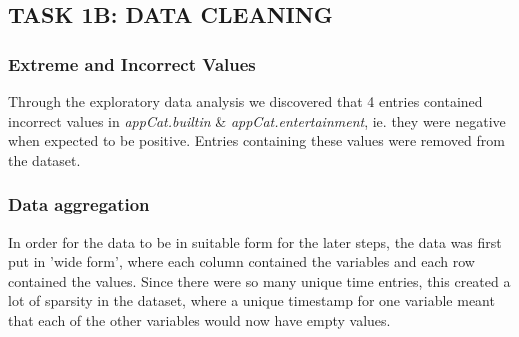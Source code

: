 \documentclass[runningheads]{llncs}
\begin{document}





\subsection{TASK 1B: DATA CLEANING}

\subsubsection{Extreme and Incorrect Values} %
\phantom
\smallskip

Through the exploratory data analysis we discovered that 4 entries contained incorrect values in \textit{appCat.builtin} \& \textit{appCat.entertainment}, ie. they were negative when expected to be positive. Entries containing these values were removed from the dataset. 

\subsubsection{Data aggregation}
\phantom
\smallskip

In order for the data to be in suitable form for the later steps, the data was first put in 'wide form', where each column contained the variables and each row contained the values. Since there were so many unique time entries, this created a lot of sparsity in the dataset, where a unique timestamp for one variable meant that each of the other variables would now have empty values. \\
\end{document}
